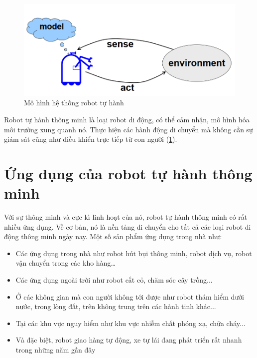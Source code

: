 \begin{figure}[htp]
  \centering
  \includegraphics[width=12cm]{figures/c1_AutonomousRBModel.png}
  \caption{Mô hình hệ thống robot tự hành}
  \label{fig:MohinhRB}
\end{figure}


Robot tự hành thông minh là loại robot di động, có thể cảm nhận, mô hình hóa môi trường xung quanh nó. Thực hiện các hành động di chuyển mà không cần sự giám sát cũng như điều khiển trực tiếp từ con người (\figurename{\ref{fig:MohinhRB}}).


\section{Ứng dụng của robot tự hành thông minh}
\label{sec:ungdung}

Với sự thông minh và cực kì linh hoạt của nó, robot tự hành thông minh có rất nhiều ứng dụng. Về cơ bản, nó là nền tảng di chuyển cho tất cả các loại robot di động thông minh ngày nay. Một số sản phẩm ứng dụng trong nhà như:

\begin{itemize}
\item Các ứng dụng trong nhà như robot hút bụi thông minh, robot dịch vụ, robot vận chuyển trong các kho hàng\dots
\item Các ứng dụng ngoài trời như robot cắt cỏ, chăm sóc cây trồng...
\item Ở các không gian mà con người không tới được như robot thám hiểm dưới nước, trong lòng đất, trên không trung trên các hành tinh khác...
\item Tại các khu vực nguy hiểm như khu vực nhiễm chất phóng xạ, chữa cháy...
\item Và đặc biệt, robot giao hàng tự động, xe tự lái đang phát triển rất nhanh trong những năm gần đây 
\end{itemize}

